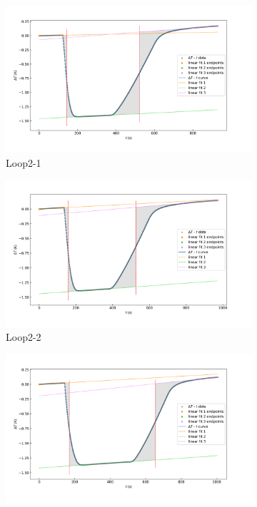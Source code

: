 \documentclass[cn,hazy,pku,12pt,normal,math=newtx,cite=super]{elegantnote}
\begin{document}
\begin{figure}[htbp]
    \centering
    \begin{subfigure}{0.45\textwidth}
        \centering
        \includegraphics[width=\linewidth]{figures/3-1.png}
        \caption*{Loop2-1}
    \end{subfigure}
    \hfill
    \begin{subfigure}{0.45\textwidth}
        \centering
        \includegraphics[width=\linewidth]{figures/3-2.png}
        \caption*{Loop2-2}
    \end{subfigure}
    \vspace{1em} %
    \begin{subfigure}{0.45\textwidth}
        \centering
        \includegraphics[width=\linewidth]{figures/3-3.png}

\end{subfigure}
\end{figure}
\end{document}
